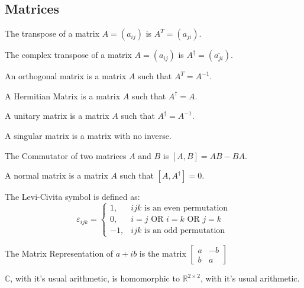\documentclass[crop=false,class=book,oneside]{standalone}
\begin{document}
\subsection{Matrices}
\begin{definition}
The transpose of a matrix $A = (a_{ij})$ is $A^{T} = (a_{ji})$.
\end{definition}
\begin{definition}
The complex transpose of a matrix $A = (a_{ij})$ is $A^{\dagger} = (\overline{a_{ji}})$.
\end{definition}
\begin{definition}
An orthogonal matrix is a matrix $A$ such that $A^T = A^{-1}$.
\end{definition}
\begin{definition}
A Hermitian Matrix is a matrix $A$ such that $A^{\dagger} = A$.
\end{definition}
\begin{definition}
A unitary matrix is a matrix $A$ such that $A^{\dagger} = A^{-1}$.
\end{definition}
\begin{definition}
A singular matrix is a matrix with no inverse.
\end{definition}
\begin{definition}
The Commutator of two matrices $A$ and $B$ is $[A,B] = AB - BA$.
\end{definition}
\begin{definition}
A normal matrix is a matrix $A$ such that $[A,A^{\dagger}] = 0$.
\end{definition}
\begin{definition}
The Levi-Civita symbol is defined as:
\begin{equation*}
    \varepsilon_{ijk} = \begin{cases} 1, & ijk\textrm{ is an even permutation} \\ 0, & i=j\textrm{ OR }i=k\textrm{ OR }j=k\\ -1, & ijk\textrm{ is an odd permutation}\end{cases}
\end{equation*}
\end{definition}
\begin{definition}
The Matrix Representation of $a+ib$ is the matrix $\begin{bmatrix}a & -b \\ b & a \end{bmatrix}$
\end{definition}
\begin{theorem}
$\mathbb{C}$, with it's usual arithmetic, is homomorphic to $\mathbb{R}^{2\times 2}$, with it's usual arithmetic.
\end{theorem}
\end{document}
